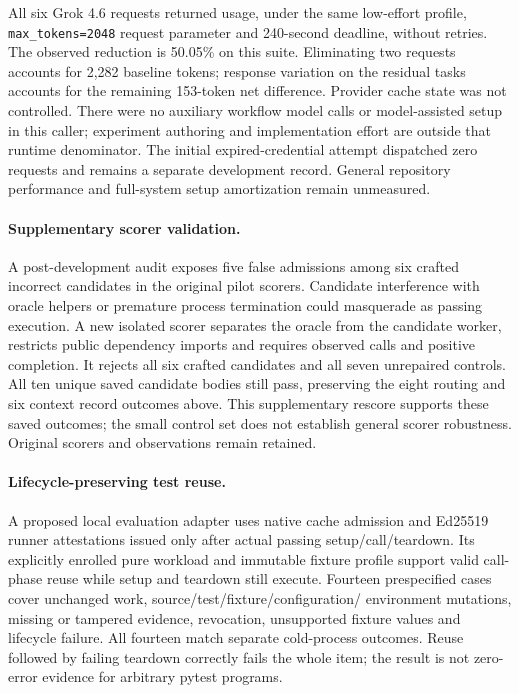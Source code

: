 All six Grok 4.6 requests returned usage, under the same low-effort profile,
\texttt{max\_tokens=2048} request parameter and 240-second deadline, without retries.
The observed reduction is 50.05\% on this suite. Eliminating two requests
accounts for 2,282 baseline tokens; response variation on the residual tasks
accounts for the remaining 153-token net difference. Provider cache state was
not controlled. There were no auxiliary workflow model calls or model-assisted
setup in this caller; experiment authoring and implementation effort are outside
that runtime denominator. The initial expired-credential attempt dispatched
zero requests and remains a separate development record. General repository
performance and full-system setup amortization remain unmeasured.

\paragraph{Supplementary scorer validation.}
A post-development audit exposes five false admissions among six crafted
incorrect candidates in the original pilot scorers. Candidate interference
with oracle helpers or premature process termination could masquerade as
passing execution. A new isolated scorer separates the oracle from the candidate
worker, restricts public dependency imports and requires observed calls and
positive completion. It rejects all six crafted candidates and all seven
unrepaired controls. All ten unique saved candidate bodies still pass, preserving
the eight routing and six context record outcomes above. This supplementary
rescore supports these saved outcomes; the small control set does not establish
general scorer robustness. Original scorers and observations remain retained.

\paragraph{Lifecycle-preserving test reuse.}
A proposed local evaluation adapter uses native cache admission and Ed25519
runner attestations issued only after actual passing setup/call/teardown.
Its explicitly enrolled pure workload and immutable fixture profile support
valid call-phase reuse while setup and teardown still execute. Fourteen
prespecified cases cover unchanged work, source/test/fixture/configuration/
environment mutations, missing or tampered evidence, revocation, unsupported
fixture values and lifecycle failure. All fourteen match separate cold-process
outcomes. Reuse followed by failing teardown correctly fails the whole item;
the result is not zero-error evidence for arbitrary pytest programs.

